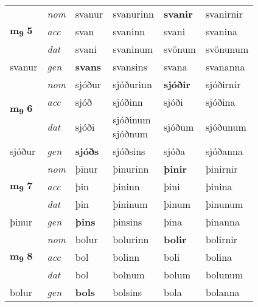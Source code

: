 \begin{longtable}[l]{llllll}
\multirow{3}{*}{{{\textbf{m{\textsubscript{9}}} \Large{\textbf{5}}}}}  & {\footnotesize{{\textit{nom}}}} & svanur & svanurinn    & \textbf{svanir} & svanirnir  \\*
 &  {\footnotesize{{\textit{acc}}}} & svan  & svaninn   & svani  & svanina \\*
 &  {\footnotesize{{\textit{dat}}}} & svani & svaninum   & svönum & svönunum \\*
 {\footnotesize{svanur}} &   {\footnotesize{{\textit{gen}}}} & \textbf{svans}  & svansins  & svana & svananna \\
\cmidrule{1-6}


\multirow{3}{*}{{{\textbf{m{\textsubscript{9}}} \Large{\textbf{6}}}}}  & {\footnotesize{{\textit{nom}}}} & sjóður & sjóðurinn    & \textbf{sjóðir} & sjóðirnir  \\*
 &  {\footnotesize{{\textit{acc}}}} & sjóð  & sjóðinn   & sjóði  & sjóðina \\*
 &  {\footnotesize{{\textit{dat}}}} & sjóði & \specialcell{sjóðinum\\ sjóðnum}   & sjóðum & sjóðunum \\*
 {\footnotesize{sjóður}} &   {\footnotesize{{\textit{gen}}}} & \textbf{sjóðs}  & sjóðsins  & sjóða & sjóðanna \\
\cmidrule{1-6}


\multirow{3}{*}{{{\textbf{m{\textsubscript{9}}} \Large{\textbf{7}}}}}  & {\footnotesize{{\textit{nom}}}} & þinur & þinurinn    & \textbf{þinir} & þinirnir  \\*
 &  {\footnotesize{{\textit{acc}}}} & þin  & þininn   & þini  & þinina \\*
 &  {\footnotesize{{\textit{dat}}}} & þin & þininum   & þinum & þinunum \\*
 {\footnotesize{þinur}} &   {\footnotesize{{\textit{gen}}}} & \textbf{þins}  & þinsins  & þina & þinanna \\
\cmidrule{1-6}


\multirow{3}{*}{{{\textbf{m{\textsubscript{9}}} \Large{\textbf{8}}}}}  & {\footnotesize{{\textit{nom}}}} & bolur & bolurinn    & \textbf{bolir} & bolirnir  \\*
 &  {\footnotesize{{\textit{acc}}}} & bol  & bolinn   & boli  & bolina \\*
 &  {\footnotesize{{\textit{dat}}}} & bol & bolnum   & bolum & bolunum \\*
 {\footnotesize{bolur}} &   {\footnotesize{{\textit{gen}}}} & \textbf{bols}  & bolsins  & bola & bolanna \\
\cmidrule{1-6}



\end{longtable}
